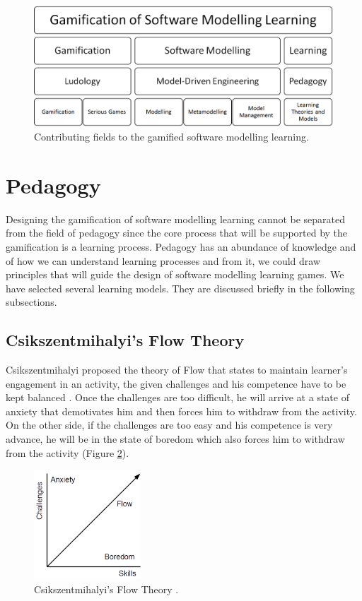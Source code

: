 \documentclass[12pt, a4paper]{report}
\begin{document}
\begin{figure}[ht]
\centering
\includegraphics[width=12cm]{smlg2}
\caption{Contributing fields to the gamified software modelling learning.}
\label{smlg2}
\end{figure}

\section{Pedagogy}
\label{Pedagogy}
Designing the gamification of software modelling learning cannot be separated from the field of pedagogy since the core process that will be supported by the gamification is a learning process. Pedagogy has an abundance of knowledge and of how we can understand learning processes and from it, we could draw principles that will guide the design of software modelling learning games. We have selected several learning models. They are discussed briefly in the following subsections.

\subsection{Csikszentmihalyi's Flow Theory}
Csikszentmihalyi proposed the theory of Flow that states to maintain learner's engagement in an activity, the given challenges and his competence have to be kept balanced \cite{csikszentmihalyi2014toward}. Once the challenges are too difficult, he will arrive at a state of anxiety that demotivates him and then forces him to withdraw from the activity. On the other side, if the challenges are too easy and his competence is very advance, he will be in the state of boredom which also forces him to withdraw from the activity (Figure \ref{flow-theory}).

\begin{figure}[ht]
\centering
\includegraphics[width=4cm]{flow-theory}
\caption{Csikszentmihalyi's Flow Theory \cite{csikszentmihalyi2014toward}.}
\label{flow-theory}
\end{figure}
 
\end{document}
